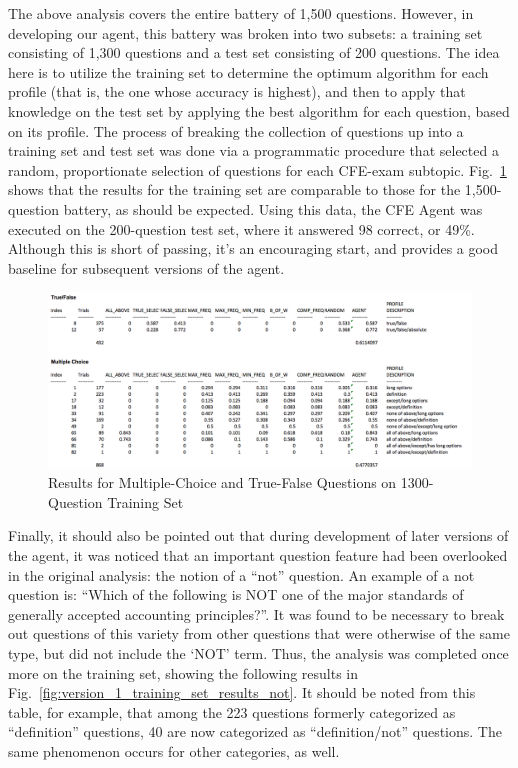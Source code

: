 The above analysis covers the entire battery of 1,500 questions.  However, in developing our agent, this battery was broken into two subsets:  a training set consisting of 1,300 questions and a test set consisting of 200 questions.  The idea here is to utilize the training set to determine the optimum algorithm for each profile (that is, the one whose accuracy is highest), and then to apply that knowledge on the test set by applying the best algorithm for each question, based on its profile.  The process of breaking the collection of questions up into a training set and test set was done via a programmatic procedure that selected a random, proportionate selection of questions for each CFE-exam subtopic.  Fig.~\ref{fig:version_1_training_set_results} shows that the results for the training set are comparable to those for the 1,500-question battery, as should be expected.  Using this data, the CFE Agent was executed on the 200-question test set, where it answered 98 correct, or 49\%.  Although this is short of passing, it's an encouraging start, and provides a good baseline for subsequent versions of the agent.

\begin{figure}
\centering
\includegraphics[width=130mm]{version_1_training_set_results.png}
\caption{Results for Multiple-Choice and True-False Questions on 1300-Question Training Set}
\label{fig:version_1_training_set_results}
\end{figure}

Finally, it should also be pointed out that during development of later versions of the agent, it was noticed that an important question feature had been overlooked in the original analysis:  the notion of a ``not'' question.  An example of a not question is:  ``Which of the following is NOT one of the major standards of generally accepted accounting principles?''.  It was found to be necessary to break out questions of this variety from other questions that were otherwise of the same type, but did not include the `NOT' term.  Thus, the analysis was completed once more on the training set, showing the following results in Fig.~\ref{fig:version_1_training_set_results_not}.  It should be noted from this table, for example, that among the 223 questions formerly  categorized as ``definition'' questions, 40 are now categorized as ``definition/not'' questions.  The same phenomenon occurs for other categories, as well.  


